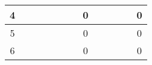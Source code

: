 \begin{adjustbox}{angle=90, captionbelow={DFMEA.}, float={table}[H]}
\begin{tabular}{|ccccccccllllc|}
\multicolumn{1}{|c|}{4}                                         & \multicolumn{1}{l|}{}                                                                                                  & \multicolumn{1}{l|}{}                                                                                                  & \multicolumn{1}{l|}{}                                                                                                    & \multicolumn{1}{c|}{}                        & \multicolumn{1}{c|}{}                        & \multicolumn{1}{c|}{}                        & \multicolumn{1}{c|}{\cellcolor[HTML]{6AA84F}0}  & \multicolumn{1}{l|}{}                                                                                                     & \multicolumn{1}{l|}{}                        & \multicolumn{1}{l|}{}                        & \multicolumn{1}{l|}{}                        & \cellcolor[HTML]{6AA84F}0  \\ \hline
\multicolumn{1}{|c|}{5}                                         & \multicolumn{1}{l|}{}                                                                                                  & \multicolumn{1}{l|}{}                                                                                                  & \multicolumn{1}{l|}{}                                                                                                    & \multicolumn{1}{l|}{}                        & \multicolumn{1}{l|}{}                        & \multicolumn{1}{l|}{}                        & \multicolumn{1}{c|}{\cellcolor[HTML]{6AA84F}0}  & \multicolumn{1}{l|}{}                                                                                                     & \multicolumn{1}{l|}{}                        & \multicolumn{1}{l|}{}                        & \multicolumn{1}{l|}{}                        & \cellcolor[HTML]{6AA84F}0  \\ \hline
\multicolumn{1}{|c|}{6}                                         & \multicolumn{1}{l|}{}                                                                                                  & \multicolumn{1}{l|}{}                                                                                                  & \multicolumn{1}{l|}{}                                                                                                    & \multicolumn{1}{l|}{}                        & \multicolumn{1}{l|}{}                        & \multicolumn{1}{l|}{}                        & \multicolumn{1}{c|}{\cellcolor[HTML]{6AA84F}0}  & \multicolumn{1}{l|}{}                                                                                                     & \multicolumn{1}{l|}{}                        & \multicolumn{1}{l|}{}                        & \multicolumn{1}{l|}{}                        & \cellcolor[HTML]{6AA84F}0  \\ \hline
\end{tabular}

\end{adjustbox}

